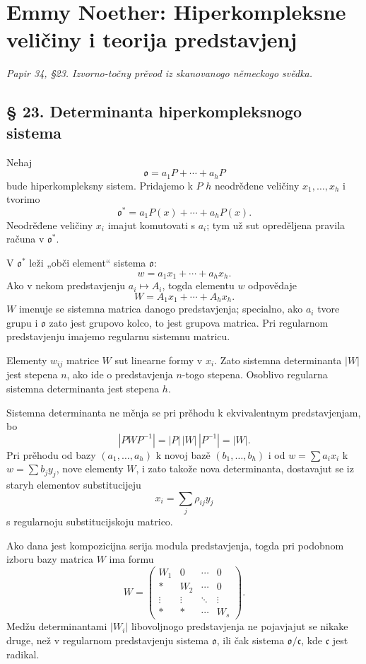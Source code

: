 \documentclass[11pt]{article}
\providecommand{\mo}{\mathfrak{o}}
\providecommand{\mc}{\mathfrak{c}}
\begin{document}
\section*{Emmy Noether: Hiperkompleksne veličiny i teorija predstavjenj}
\emph{Papir 34, §23. Izvorno-točny prěvod iz skanovanogo německogo svědka.}

\subsection*{§ 23. Determinanta hiperkompleksnogo sistema}

Nehaj
\[
        \mo=a_1P+\cdots+a_hP
\]
bude hiperkompleksny sistem. Pridajemo k $P$ $h$ neodrěđene veličiny $x_1,\ldots,x_h$ i tvorimo
\[
        \mo^*=a_1P(x)+\cdots+a_hP(x).
\]
Neodrěđene veličiny $x_i$ imajut komutovati s $a_i$; tym už sut opreděljena pravila računa v $\mo^*$.

V $\mo^*$ leži „obči element“ sistema $\mo$:
\[
        w=a_1x_1+\cdots+a_hx_h.
\]
Ako v nekom predstavjenju $a_i\mapsto A_i$, togda elementu $w$ odpovědaje
\[
        W=A_1x_1+\cdots+A_hx_h.
\]
$W$ imenuje se sistemna matrica danogo predstavjenja; specialno, ako $a_i$ tvore grupu i $\mo$ zato jest grupovo kolco, to jest grupova matrica. Pri regularnom predstavjenju imajemo regularnu sistemnu matricu.

Elementy $w_{ij}$ matrice $W$ sut linearne formy v $x_i$. Zato sistemna determinanta $|W|$ jest stepena $n$, ako ide o predstavjenja $n$-togo stepena. Osoblivo regularna sistemna determinanta jest stepena $h$.

Sistemna determinanta ne měnja se pri prěhodu k ekvivalentnym predstavjenjam, bo
\[
        |PWP^{-1}|=|P|\,|W|\,|P^{-1}|=|W|.
\]
Pri prěhodu od bazy $(a_1,\ldots,a_h)$ k novoj bazě $(b_1,\ldots,b_h)$ i od $w=\sum a_ix_i$ k $w=\sum b_jy_j$, nove elementy $W$, i zato takože nova determinanta, dostavajut se iz staryh elementov substitucijeju
\[
        x_i=\sum_j\rho_{ij}y_j
\]
s regularnoju substitucijskoju matrico.

Ako dana jest kompozicijna serija modula predstavjenja, togda pri podobnom izboru bazy matrica $W$ ima formu
\[
        W=\begin{pmatrix}
        W_1&0&\cdots&0\\
        *&W_2&\cdots&0\\
        \vdots&\vdots&\ddots&\vdots\\
        *&*&\cdots&W_s
        \end{pmatrix}.
\]
Medžu determinantami $|W_i|$ libovoljnogo predstavjenja ne pojavjajut se nikake druge, než v regularnom predstavjenju sistema $\mo$, ili čak sistema $\mo/\mc$, kde $\mc$ jest radikal.
\end{document}

